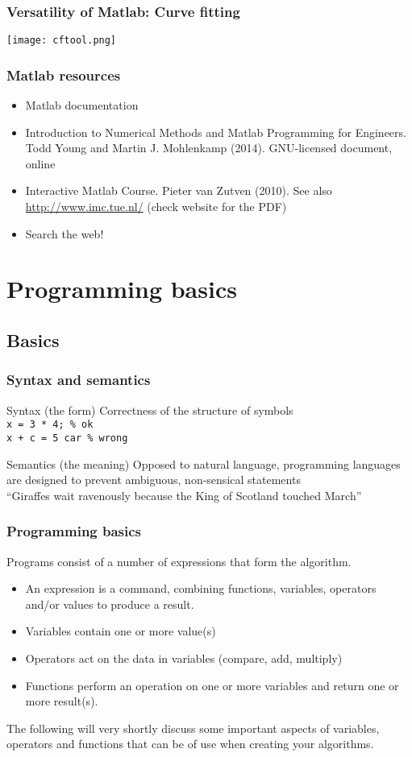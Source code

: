\documentclass[11pt,table,final,fleqn,xcolor={usenames,dvipsnames},unknownkeysallowed]{beamer}
\begin{document}
\begin{frame}
\frametitle{Versatility of Matlab: Curve fitting}
\texttt{[image: cftool.png]}
\end{frame}

\begin{frame}
\frametitle{Matlab resources}
\begin{itemize}[<+->]
  \item Matlab documentation
  \item Introduction to Numerical Methods and Matlab Programming for Engineers. Todd Young and Martin J. Mohlenkamp (2014). GNU-licensed document, online
  \item Interactive Matlab Course. Pieter van Zutven (2010). See also \url{http://www.imc.tue.nl/} (check website for the PDF)
  \item Search the web!
\end{itemize}
\end{frame}
%
\section{Programming basics}
\subsection*{Basics}
\begin{frame}[fragile]
 \frametitle{Syntax and semantics}
   \begin{block}{Syntax (the form)}
   Correctness of the structure of symbols \\
   \lstinline$x = 3 * 4; % ok$ \\
   \lstinline$x + c = 5 car % wrong$
   \end{block}
  \begin{block}{Semantics (the meaning)}
   Opposed to natural language, programming languages are designed to prevent ambiguous, non-sensical statements  \\
   ``Giraffes wait ravenously because the King of Scotland touched March''
   \end{block}
\end{frame}

\begin{frame}
\frametitle{Programming basics}
Programs consist of a number of expressions that form the algorithm. 
  \begin{itemize}
    \item An expression is a command, combining functions, variables, operators and/or values to produce a result.
    \item Variables contain one or more value(s)
    \item Operators act on the data in variables (compare, add, multiply)
    \item Functions perform an operation on one or more variables and return one or more result(s).
  \end{itemize}
  The following will very shortly discuss some important aspects of variables, operators and functions that can be of use when creating your algorithms.
\end{frame}
\end{document}
